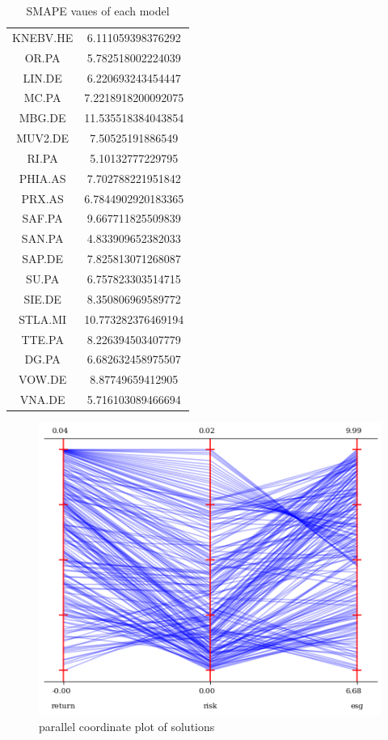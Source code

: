 \documentclass[11pt]{article} %
\begin{document}
\begin{table}[H]
\begin{tabular}{ | c | c |}
KNEBV.HE & 6.111059398376292\\
OR.PA    & 5.782518002224039\\
LIN.DE   & 6.220693243454447\\
MC.PA    & 7.2218918200092075\\
MBG.DE   & 11.535518384043854\\
MUV2.DE  & 7.50525191886549\\
RI.PA    & 5.10132777229795\\
PHIA.AS  & 7.702788221951842\\
PRX.AS   & 6.7844902920183365\\
SAF.PA   & 9.667711825509839\\
SAN.PA   & 4.833909652382033\\
SAP.DE   & 7.825813071268087\\
SU.PA    & 6.757823303514715\\
SIE.DE   & 8.350806969589772\\
STLA.MI  & 10.773282376469194\\
TTE.PA   & 8.226394503407779\\
DG.PA    & 6.682632458975507\\
VOW.DE   & 8.87749659412905\\
VNA.DE   & 5.716103089466694\\
\hline
\end{tabular}
\caption{\label{tab:table-name} SMAPE vaues of each model}
\end{table}

\begin{figure}[H]
\caption{parallel coordinate plot of solutions}
\includegraphics{pcpPlot}
\end{figure}
\end{document}
